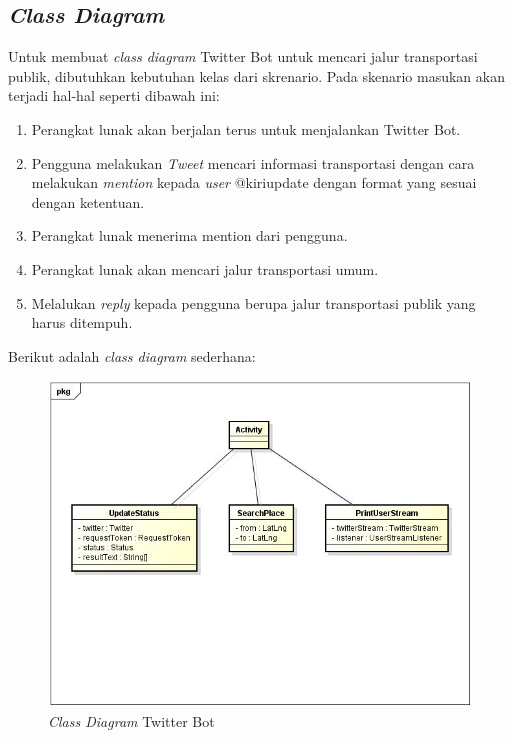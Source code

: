 \subsection{\textit{Class Diagram}}
Untuk membuat \textit{class diagram} Twitter Bot untuk mencari jalur transportasi publik, dibutuhkan kebutuhan kelas dari skrenario. Pada skenario masukan akan terjadi hal-hal seperti dibawah ini:
\begin{enumerate}
	\item Perangkat lunak akan berjalan terus untuk menjalankan Twitter Bot.
	\item Pengguna melakukan \textit{Tweet} mencari informasi transportasi dengan cara melakukan \textit{mention} kepada \textit{user} @kiriupdate dengan format yang sesuai dengan ketentuan.
	\item Perangkat lunak menerima mention dari pengguna.
	\item Perangkat lunak akan mencari jalur transportasi umum.
	\item Melalukan \textit{reply} kepada pengguna berupa jalur transportasi publik yang harus ditempuh. 
\end{enumerate}

Berikut adalah \textit{class diagram} sederhana:
\begin{figure}[htbp]
	\centering
		\includegraphics{Gambar/diagramClass.jpg}
	\caption{\textit{Class Diagram} Twitter Bot}
	\label{fig:classdiagram}
\end{figure}